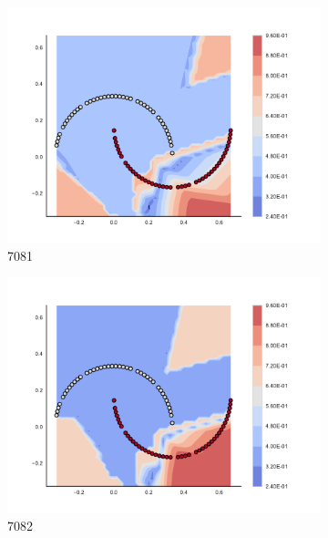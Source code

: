 \begin{figure}[h]
\begin{subfigure}[b]{0.09\textwidth}
    \includegraphics[clip, trim=2.35cm 1.75cm 4.5cm 0cm,width=\textwidth]{img/convergence/7081.pdf}
    \caption{7081}
    \label{fig:convergence_7081}
\end{subfigure}
%
\begin{subfigure}[b]{0.09\textwidth}
    \includegraphics[clip, trim=2.35cm 1.75cm 4.5cm 0cm,width=\textwidth]{img/convergence/7082.pdf}
    \caption{7082}
    \label{fig:convergence_7082}
\end{subfigure}
%
\begin{subfigure}[b]{0.09\textwidth}

\end{subfigure}
\end{figure}

